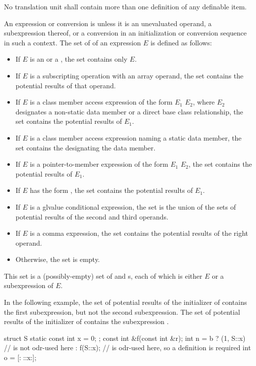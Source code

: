 \pnum
No translation unit shall contain more than one definition of any
definable item.

\pnum
{}%
An expression or conversion is  unless it is
an unevaluated operand,
a subexpression thereof, or
a conversion in an initialization or conversion sequence in such a context.
The set of  of an expression $E$ is
defined as follows:
\begin{itemize}
\item If $E$ is
an  or
a , the set
contains only $E$.
\item If $E$ is a subscripting operation with
an array operand, the set contains the potential results of that operand.
\item If $E$ is a class member access
expression of the form
$E_1$   $E_2$,
where $E_2$ designates a non-static data member or
a direct base class relationship,
the set contains the potential results of $E_1$.
\item If $E$ is a class member access expression
naming a static data member,
the set contains the  designating the data member.
\item If $E$ is a pointer-to-member
expression of the form
$E_1$  $E_2$,
the set contains the potential results of $E_1$.
\item If $E$ has the form , the set contains the
potential results of $E_1$.
\item If $E$ is a glvalue conditional
expression, the set is the union of the sets of
potential results of the second and third operands.
\item If $E$ is a comma expression, the set
contains the potential results of the right operand.
\item Otherwise, the set is empty.
\end{itemize}
\begin{note}
This set is a (possibly-empty) set of
 and s,
each of which is either $E$ or a subexpression of $E$.
\begin{example}
In the following example, the set of potential results of the initializer
of  contains the first  subexpression, but not the second
 subexpression.
The set of potential results of the initializer of  contains
the subexpression .
\begin{codeblock}
struct S { static const int x = 0; };
const int &f(const int &r);
int n = b ? (1, S::x)           //  is not odr-used here
          : f(S::x);            //  is odr-used here, so a definition is required
int o = [:^^S::x:];
\end{codeblock}
\end{example}
\end{note}

